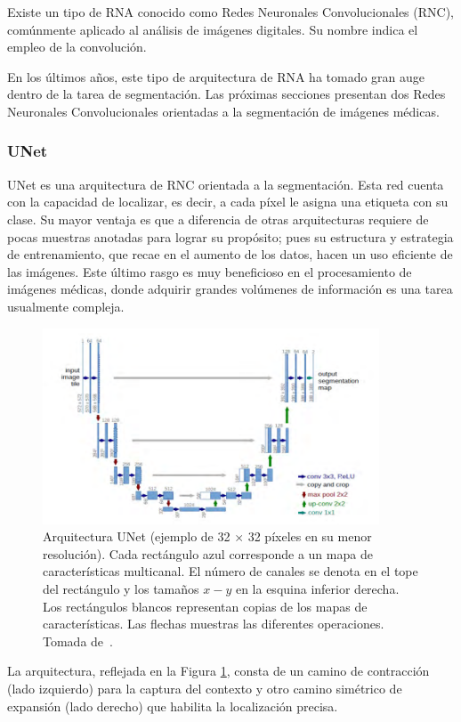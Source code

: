 Existe un tipo de RNA conocido como Redes Neuronales Convolucionales (RNC), comúnmente aplicado al análisis de imágenes digitales. Su nombre indica el empleo de la convolución.

En los últimos años, este tipo de arquitectura de RNA ha tomado gran auge dentro de la tarea de segmentación. Las próximas secciones presentan dos Redes Neuronales Convolucionales orientadas a la segmentación de imágenes médicas.

\subsubsection{UNet}

UNet es una arquitectura de RNC orientada a la segmentación. Esta red cuenta con la capacidad de localizar, es decir, a cada píxel le asigna una etiqueta con su clase. Su mayor ventaja es que a diferencia de otras arquitecturas requiere de pocas muestras anotadas para lograr su propósito; pues su estructura y estrategia de entrenamiento, que recae en el aumento de los datos, hacen un uso eficiente de las imágenes. Este último rasgo es muy beneficioso en el procesamiento de imágenes médicas, donde adquirir grandes volúmenes de información es una tarea usualmente compleja.

\begin{figure}[ht]
	\centering
	\includegraphics[width=10cm]{./Graphics/unet.png}
	\caption{Arquitectura UNet (ejemplo de 32 $\times$ 32 píxeles en su menor resolución). Cada rectángulo azul corresponde a un mapa de características multicanal. El número de canales se denota en el tope del rectángulo y los tamaños $x-y$ en la esquina inferior derecha. Los rectángulos blancos representan copias de los mapas de características. Las flechas muestras las diferentes operaciones. Tomada de~\cite{ronneberger2015u}.}
	\label{fig:unet}
\end{figure}

La arquitectura, reflejada en la Figura \ref{fig:unet}, consta de un camino de contracción (lado izquierdo) para la captura del contexto y otro camino simétrico de expansión (lado derecho) que habilita la localización precisa.

